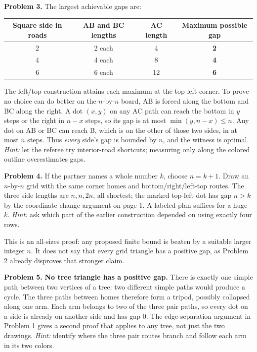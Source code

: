 \documentclass[11pt,letterpaper]{article}
\begin{document}
\textbf{Problem 3.} The largest achievable gaps are:
\begin{center}\renewcommand{\arraystretch}{1.15}
\begin{tabular}{@{}cccc@{}}\toprule
Square side in roads & AB and BC lengths & AC length & Maximum possible gap\\\midrule
2 & 2 each & 4 & \textbf{2}\\
4 & 4 each & 8 & \textbf{4}\\
6 & 6 each & 12 & \textbf{6}\\\bottomrule
\end{tabular}\end{center}
The left/top construction attains each maximum at the top-left corner. To prove no choice can do better on the $n$-by-$n$ board, AB is forced along the bottom and BC along the right. A dot $(x,y)$ on any AC path can reach the bottom in $y$ steps or the right in $n-x$ steps, so its gap is at most $\min(y,n-x)\le n$. Any dot on AB or BC can reach B, which is on the other of those two sides, in at most $n$ steps. Thus \emph{every} side's gap is bounded by $n$, and the witness is optimal. \emph{Hint:} let the referee try interior-road shortcuts; measuring only along the colored outline overestimates gaps.

\textbf{Problem 4.} If the partner names a whole number $k$, choose \textbf{$n=k+1$}. Draw an $n$-by-$n$ grid with the same corner homes and bottom/right/left-top routes. The three side lengths are $n,n,2n$, all shortest; the marked top-left dot has gap $n>k$ by the coordinate-change argument on page 1. A labeled plan suffices for a huge $k$. \emph{Hint:} ask which part of the earlier construction depended on using exactly four rows.

This is an all-sizes proof: any proposed finite bound is beaten by a suitable larger integer $n$. It does not say that every grid triangle has a positive gap, as Problem 2 already disproves that stronger claim.

\textbf{Problem 5.} \textbf{No tree triangle has a positive gap.} There is exactly one simple path between two vertices of a tree: two different simple paths would produce a cycle. The three paths between homes therefore form a tripod, possibly collapsed along one arm. Each arm belongs to two of the three pair paths, so every dot on a side is already on another side and has gap 0. The edge-separation argument in Problem 1 gives a second proof that applies to any tree, not just the two drawings. \emph{Hint:} identify where the three pair routes branch and follow each arm in its two colors.
\end{document}
